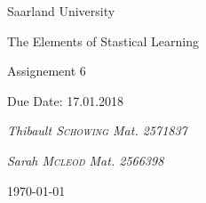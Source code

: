 \documentclass[11pt,a4paper,twoside,openright]{report}
\author{Thibault Schowing and Sarah Mcleod}
\newcommand\blankpage{%
	\null
	\thispagestyle{empty}%
	\addtocounter{page}{-1}%
	\newpage}
\begin{document}
	
	\pagestyle{plain}%

	
	
	\begin{titlepage}
		\centering
		
		\small{Saarland University  \par}
		\huge{The Elements of Stastical Learning\par}
		\vspace{1cm}
		
		
		
		\vspace{1cm}
		\Large{Assignement 6\par}
		\vspace{1.5cm}
		\small{Due Date: 17.01.2018  \par}
		\vspace{1cm}
		
		
		
		\vspace{2cm}
		\small\textit{Thibault \textsc{Schowing} Mat. 2571837}\par
		\small\textit{Sarah \textsc{Mcleod} Mat. 2566398}\par
		
		\small{\today\par}
		
		\vfill
		
		
	\end{titlepage}
	\restoregeometry 
	
	
	
	
	
	
	
	
	

	
\end{document}
